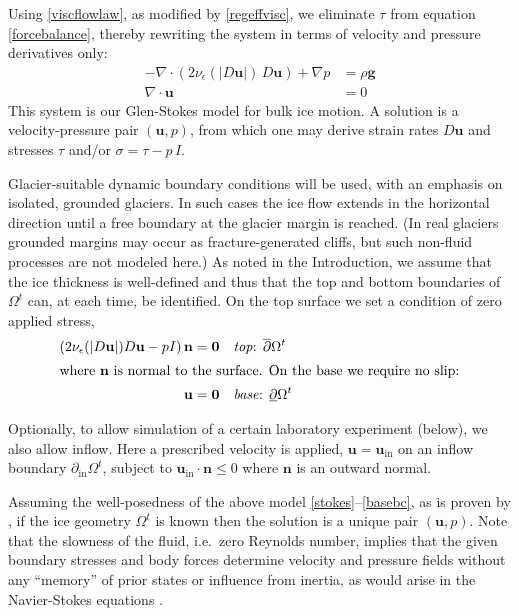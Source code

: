 \documentclass[letterpaper,final,12pt,reqno]{amsart}
\newcommand{\eps}{\epsilon}
\newcommand{\Div}{\nabla\cdot}
\newcommand{\bn}{\mathbf{n}}
\newcommand{\bu}{\mathbf{u}}
\newcommand{\bzero}{\bm{0}}
\begin{document}
Using \eqref{viscflowlaw}, as modified by \eqref{regeffvisc}, we eliminate $\tau$ from equation \eqref{forcebalance}, thereby rewriting the system in terms of velocity and pressure derivatives only:
\begin{align}
- \nabla \cdot \left(2 \nu_\eps(|D\bu|)\, D\bu\right) + \nabla p &= \rho \mathbf{g} \label{stokes} \\
\Div \bu &= 0 \label{incompagain}
\end{align}
This system is our Glen-Stokes model for bulk ice motion.  A solution is a velocity-pressure pair $(\bu,p)$, from which one may derive strain rates $D\bu$ and stresses $\tau$ and/or $\sigma = \tau - p\,I$.

Glacier-suitable dynamic boundary conditions will be used, with an emphasis on isolated, grounded glaciers.  In such cases the ice flow extends in the horizontal direction until a free boundary at the glacier margin is reached.  (In real glaciers grounded margins may occur as fracture-generated cliffs, but such non-fluid processes are not modeled here.)  As noted in the Introduction, we assume that the ice thickness is well-defined and thus that the top and bottom boundaries of $\Omega^t$ can, at each time, be identified.  On the top surface we set a condition of zero applied stress,
\begin{align}
\left(2 \nu_\eps(|D\bu|) D\bu - pI\right) \bn &= \bzero  &&\text{\emph{top}: } \overline{\partial} \Omega^t \label{topbc} \\
\intertext{where $\bn$ is normal to the surface.  On the base we require no slip:}
\bu &= \bzero  &&\text{\emph{base}: } \underline{\partial} \Omega^t \label{basebc}
\end{align}

Optionally, to allow simulation of a certain laboratory experiment \cite{SayagWorster2013} (below), we also allow inflow.  Here a prescribed velocity is applied, $\bu = \bu_{\text{in}}$ on an inflow boundary $\partial_{\text{in}} \Omega^t$, subject to $\bu_{\text{in}}\cdot \bn \le 0$ where $\bn$ is an outward normal.

Assuming the well-posedness of the above model \eqref{stokes}--\eqref{basebc}, as is proven by \cite{JouvetRappaz2011}, if the ice geometry $\Omega^t$ is known then the solution is a unique pair $(\bu,p)$.  Note that the slowness of the fluid, i.e.~zero Reynolds number, implies that the given boundary stresses and body forces determine velocity and pressure fields without any ``memory'' of prior states or influence from inertia, as would arise in the Navier-Stokes equations \cite{Fowler1997}.
\end{document}
